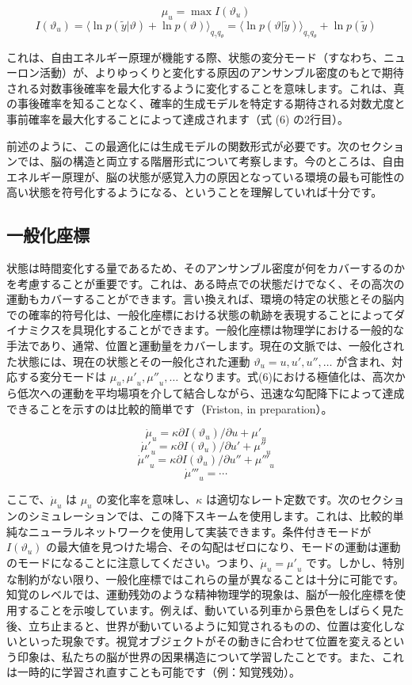 \documentclass{article}
\begin{document}
$$\mu_u=\max I(\vartheta_u)$$
$$I(\vartheta_u)=\langle\ln p(\tilde{y}|\vartheta)+\ln p(\vartheta)\rangle_{q_\gamma q_\theta}=\langle\ln p(\vartheta|\tilde{y})\rangle_{q_\gamma q_\theta}+\ln p(\tilde{y})$$

これは、自由エネルギー原理が機能する際、状態の変分モード（すなわち、ニューロン活動）が、よりゆっくりと変化する原因のアンサンブル密度のもとで期待される対数事後確率を最大化するように変化することを意味します。これは、真の事後確率を知ることなく、確率的生成モデルを特定する期待される対数尤度と事前確率を最大化することによって達成されます（式 (6) の2行目）。

前述のように、この最適化には生成モデルの関数形式が必要です。次のセクションでは、脳の構造と両立する階層形式について考察します。今のところは、自由エネルギー原理が、脳の状態が感覚入力の原因となっている環境の最も可能性の高い状態を符号化するようになる、ということを理解していれば十分です。

\subsection{一般化座標}
状態は時間変化する量であるため、そのアンサンブル密度が何をカバーするのかを考慮することが重要です。これは、ある時点での状態だけでなく、その高次の運動もカバーすることができます。言い換えれば、環境の特定の状態とその脳内での確率的符号化は、一般化座標における状態の軌跡を表現することによってダイナミクスを具現化することができます。一般化座標は物理学における一般的な手法であり、通常、位置と運動量をカバーします。現在の文脈では、一般化された状態には、現在の状態とその一般化された運動 $\vartheta_u=u,u',u'',\dots$ が含まれ、対応する変分モードは $\mu_u,{\mu'}_u,{\mu''}_u,\dots$ となります。式(6)における極値化は、高次から低次への運動を平均場項を介して結合しながら、迅速な勾配降下によって達成できることを示すのは比較的簡単です（Friston, in preparation）。

$$\dot{\mu}_u=\kappa\partial I(\vartheta_u)/\partial u+{\mu'}_u$$$${\dot{\mu}'}_u=\kappa\partial I(\vartheta_u)/\partial u'+{\mu''}_u$$$${\dot{\mu}''}_u=\kappa\partial I(\vartheta_u)/\partial u''+{\mu'''}_u$$
$${\dot{\mu}'''}_u=\cdots$$

ここで、$\dot{\mu}_u$ は $\mu_u$ の変化率を意味し、$\kappa$ は適切なレート定数です。次のセクションのシミュレーションでは、この降下スキームを使用します。これは、比較的単純なニューラルネットワークを使用して実装できます。条件付きモードが $I(\vartheta_u)$ の最大値を見つけた場合、その勾配はゼロになり、モードの運動は運動のモードになることに注意してください。つまり、$\dot{\mu}_u={\mu'}_u$ です。しかし、特別な制約がない限り、一般化座標ではこれらの量が異なることは十分に可能です。知覚のレベルでは、運動残効のような精神物理学的現象は、脳が一般化座標を使用することを示唆しています。例えば、動いている列車から景色をしばらく見た後、立ち止まると、世界が動いているように知覚されるものの、位置は変化しないといった現象です。視覚オブジェクトがその動きに合わせて位置を変えるという印象は、私たちの脳が世界の因果構造について学習したことです。また、これは一時的に学習され直すことも可能です（例：知覚残効）。
\end{document}

